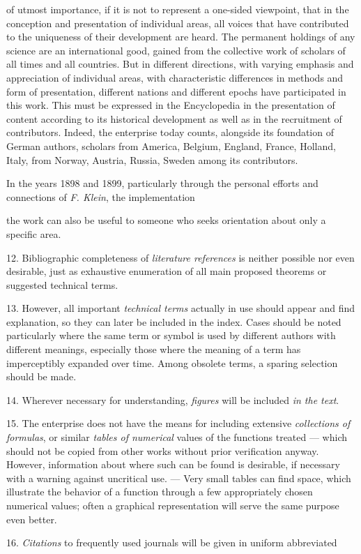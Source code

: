\thispagestyle{fancy}

\vspace{0.5cm}

of utmost importance, if it is not to represent a one-sided viewpoint, that in the conception and presentation of individual areas, all voices that have contributed to the uniqueness of their development are heard. The permanent holdings of any science are an international good, gained from the collective work of scholars of all times and all countries. But in different directions, with varying emphasis and appreciation of individual areas, with characteristic differences in methods and form of presentation, different nations and different epochs have participated in this work. This must be expressed in the Encyclopedia in the presentation of content according to its historical development as well as in the recruitment of contributors. Indeed, the enterprise today counts, alongside its foundation of German authors, scholars from America, Belgium, England, France, Holland, Italy, from Norway, Austria, Russia, Sweden among its contributors.

In the years 1898 and 1899, particularly through the personal efforts and connections of \textit{F. Klein}, the implementation

\vfill
\leftline{\rule{2in}{0.4pt}}
\vspace{0.2cm}
{\footnotesize 

the work can also be useful to someone who seeks orientation about only a specific area.

12. Bibliographic completeness of \textit{literature references} is neither possible nor even desirable, just as exhaustive enumeration of all main proposed theorems or suggested technical terms.

13. However, all important \textit{technical terms} actually in use should appear and find explanation, so they can later be included in the index. Cases should be noted particularly where the same term or symbol is used by different authors with different meanings, especially those where the meaning of a term has imperceptibly expanded over time. Among obsolete terms, a sparing selection should be made.

14. Wherever necessary for understanding, \textit{figures} will be included \textit{in the text}.

15. The enterprise does not have the means for including extensive \textit{collections of formulas}, or similar \textit{tables of numerical} values of the functions treated — which should not be copied from other works without prior verification anyway. However, information about where such can be found is desirable, if necessary with a warning against uncritical use. — Very small tables can find space, which illustrate the behavior of a function through a few appropriately chosen numerical values; often a graphical representation will serve the same purpose even better.

16. \textit{Citations} to frequently used journals will be given in uniform abbreviated

}
